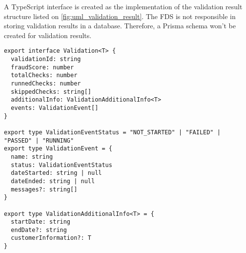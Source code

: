     A TypeScript interface is created as the implementation of the validation result structure listed on \autoref{fig:uml_validation_result}. The FDS is not responsible in storing validation results in a database. Therefore, a Prisma schema won't be created for validation results. 

    \begin{lstlisting}[style=es6, caption={TypeScript interface of a validation result (TypeScript)}]
export interface Validation<T> {
  validationId: string
  fraudScore: number
  totalChecks: number
  runnedChecks: number
  skippedChecks: string[]
  additionalInfo: ValidationAdditionalInfo<T>
  events: ValidationEvent[]
}

export type ValidationEventStatus = "NOT_STARTED" | "FAILED" | "PASSED" | "RUNNING"
export type ValidationEvent = {
  name: string
  status: ValidationEventStatus
  dateStarted: string | null
  dateEnded: string | null
  messages?: string[]
}

export type ValidationAdditionalInfo<T> = {
  startDate: string
  endDate?: string
  customerInformation?: T
}
    \end{lstlisting}